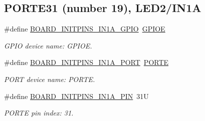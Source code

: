 \subsection*{P\+O\+R\+T\+E31 (number 19), L\+E\+D2/\+I\+N1A}
\begin{DoxyCompactItemize}
\item 
\mbox{\label{group__pin__mux_ga477644f95ceb11317f171cada49375e4}} 
\#define \mbox{\hyperlink{group__pin__mux_ga477644f95ceb11317f171cada49375e4}{B\+O\+A\+R\+D\+\_\+\+I\+N\+I\+T\+P\+I\+N\+S\+\_\+\+I\+N1\+A\+\_\+\+G\+P\+IO}}~\mbox{\hyperlink{group___g_p_i_o___peripheral___access___layer_gae04bdb5e8acc47cab1d0532e6b0d0763}{G\+P\+I\+OE}}
\begin{DoxyCompactList}\small\item\em G\+P\+IO device name\+: G\+P\+I\+OE. \end{DoxyCompactList}\item 
\mbox{\label{group__pin__mux_ga6f39efd4950221751f1143d85a5f1af3}} 
\#define \mbox{\hyperlink{group__pin__mux_ga6f39efd4950221751f1143d85a5f1af3}{B\+O\+A\+R\+D\+\_\+\+I\+N\+I\+T\+P\+I\+N\+S\+\_\+\+I\+N1\+A\+\_\+\+P\+O\+RT}}~\mbox{\hyperlink{group___p_o_r_t___peripheral___access___layer_ga7e2386d3b1084b5b875ae3696f550ba9}{P\+O\+R\+TE}}
\begin{DoxyCompactList}\small\item\em P\+O\+RT device name\+: P\+O\+R\+TE. \end{DoxyCompactList}\item 
\mbox{\label{group__pin__mux_gaf4eb0408529a1675aeaa4148cd89461e}} 
\#define \mbox{\hyperlink{group__pin__mux_gaf4eb0408529a1675aeaa4148cd89461e}{B\+O\+A\+R\+D\+\_\+\+I\+N\+I\+T\+P\+I\+N\+S\+\_\+\+I\+N1\+A\+\_\+\+P\+IN}}~31U
\begin{DoxyCompactList}\small\item\em P\+O\+R\+TE pin index\+: 31. \end{DoxyCompactList}\end{DoxyCompactItemize}
